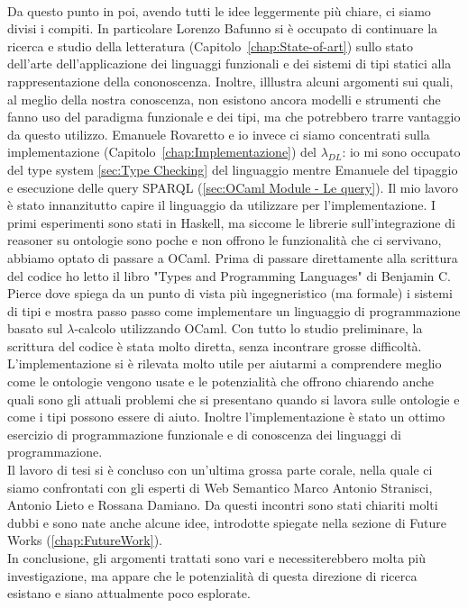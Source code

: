 \\Da questo punto in poi, avendo tutti le idee leggermente più chiare, ci siamo divisi i compiti. In particolare Lorenzo Bafunno si
è occupato di continuare la ricerca e studio della letteratura (Capitolo~\ref{chap:State-of-art}) sullo stato dell'arte dell'applicazione dei linguaggi funzionali e dei sistemi di tipi statici alla rappresentazione della cononoscenza. Inoltre, illlustra alcuni argomenti sui quali, al meglio della nostra conoscenza, non esistono ancora modelli e strumenti che fanno uso del paradigma funzionale e dei tipi, ma che potrebbero trarre vantaggio da questo utilizzo. 
Emanuele Rovaretto e io invece ci siamo concentrati sulla implementazione (Capitolo~\ref{chap:Implementazione})
del $\lambda_{DL}$: io mi sono occupato del type system \autoref{sec:Type Checking} del linguaggio mentre Emanuele del tipaggio e esecuzione delle query SPARQL (\autoref{sec:OCaml Module - Le query}).
Il mio lavoro è stato innanzitutto capire il linguaggio da utilizzare per l'implementazione. I primi esperimenti sono stati in Haskell, ma siccome le librerie
sull'integrazione di reasoner su ontologie sono poche e non offrono le funzionalità che ci servivano, abbiamo optato di passare a OCaml. 
Prima di passare direttamente alla scrittura del codice ho letto il libro "Types and Programming Languages" \cite{TypesAndProgrammingLanguages} di Benjamin C. Pierce dove spiega da un punto di vista
più ingegneristico (ma formale) i sistemi di tipi e mostra passo passo come implementare un linguaggio di programmazione basato sul $\lambda$-calcolo utilizzando OCaml.
Con tutto lo studio preliminare, la scrittura del codice è stata molto diretta, senza incontrare grosse difficoltà.
\\L'implementazione si è rilevata molto utile per aiutarmi a comprendere meglio come le ontologie vengono usate e le potenzialità che offrono chiarendo anche
quali sono gli attuali problemi che si presentano quando si lavora sulle ontologie e come i tipi possono essere di aiuto. Inoltre l'implementazione è stato un ottimo
esercizio di programmazione funzionale e di conoscenza dei linguaggi di programmazione.
\\Il lavoro di tesi si è concluso con un'ultima grossa parte corale, nella quale ci siamo confrontati con gli esperti
di Web Semantico Marco Antonio Stranisci, Antonio Lieto e Rossana Damiano. Da questi incontri sono stati chiariti molti dubbi e sono nate anche alcune idee, introdotte
spiegate nella sezione di Future Works (\autoref{chap:FutureWork}).
\\In conclusione, gli argomenti trattati sono vari e necessiterebbero molta più investigazione, ma appare che le potenzialità di questa direzione di ricerca esistano e siano attualmente poco esplorate. 